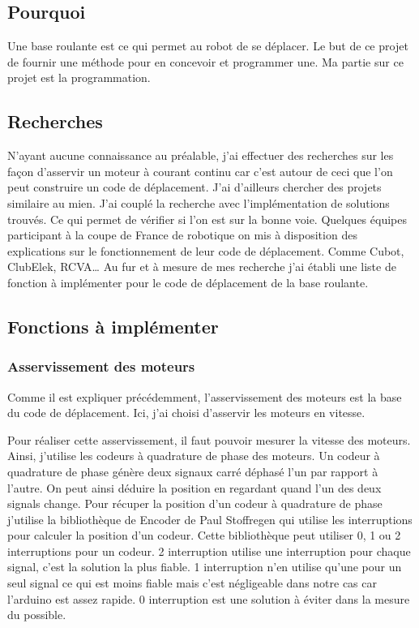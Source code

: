 \documentclass[11pt,a4paper]{report}
\begin{document}
    \subsection{Pourquoi}
      Une base roulante est ce qui permet au robot de se déplacer. Le but de ce projet de fournir une méthode pour en concevoir et programmer une. Ma partie sur ce projet est la programmation.

    \subsection{Recherches}
      N'ayant aucune connaissance au préalable, j'ai effectuer des recherches sur les façon d'asservir un moteur à courant continu car c'est autour de ceci que l'on peut construire un code de déplacement. J'ai d'ailleurs chercher des projets similaire au mien.
      J'ai couplé la recherche avec l'implémentation de solutions trouvés. Ce qui permet de vérifier si l'on est sur la bonne voie.
      Quelques équipes participant à la coupe de France de robotique on mis à disposition des explications sur le fonctionnement de leur code de déplacement. Comme Cubot, ClubElek, RCVA…
      Au fur et à mesure de mes recherche j'ai établi une liste de fonction à implémenter pour le code de déplacement de la base roulante.

    \subsection{Fonctions à implémenter}
      \subsubsection{Asservissement des moteurs}
        Comme il est expliquer précédemment, l'asservissement des moteurs est la base du code de déplacement. Ici, j'ai choisi d'asservir les moteurs en vitesse.

        Pour réaliser cette asservissement, il faut pouvoir mesurer la vitesse des moteurs. Ainsi, j'utilise les codeurs à quadrature de phase des moteurs.
        Un codeur à quadrature de phase génère deux signaux carré déphasé l'un par rapport à l'autre. On peut ainsi déduire la position en regardant quand l'un des deux signals change.
        Pour récuper la position d'un codeur à quadrature de phase j'utilise la bibliothèque de Encoder de Paul Stoffregen qui utilise les interruptions pour calculer la position d'un codeur. Cette bibliothèque peut utiliser 0, 1 ou 2 interruptions pour un codeur. 2 interruption utilise une interruption pour chaque signal, c'est la solution la plus fiable. 1 interruption n'en utilise qu'une pour un seul signal ce qui est moins fiable mais c'est négligeable dans notre cas car l'arduino est assez rapide. 0 interruption est une solution à éviter dans la mesure du possible.
\end{document}
